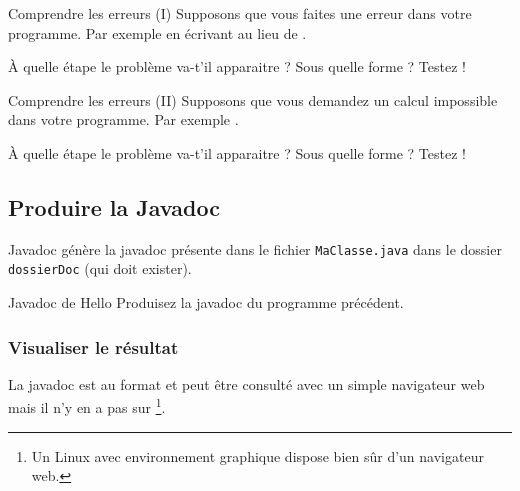 \documentclass[a4paper,11pt]{style-esi/td}
\begin{document}

		\begin{Exercice}{Comprendre les erreurs (I)}
			Supposons que vous faites une erreur dans votre programme.
			Par exemple en écrivant  
			au lieu de .

			À quelle étape le problème va-t'il apparaitre ?
			Sous quelle forme ? Testez !
		\end{Exercice}

		\begin{Exercice}{Comprendre les erreurs (II)}
			Supposons que vous demandez un calcul impossible dans votre programme.
			Par exemple .

			À quelle étape le problème va-t'il apparaitre ?
			Sous quelle forme ? Testez !
		\end{Exercice}

	\subsection{Produire la Javadoc}

		\begin{theorie}{Javadoc}
			génère la javadoc présente dans le fichier \texttt{MaClasse.java}
			dans le dossier \texttt{dossierDoc} (qui doit exister).
		\end{theorie}

		\begin{Exercice}{Javadoc de Hello}
			Produisez la javadoc du programme  précédent.
		\end{Exercice}

		\subsubsection*{Visualiser le résultat}

			La javadoc est au format  et peut être consulté
			avec un simple navigateur web mais il n'y en a pas sur %
			\footnote{%
				Un Linux avec environnement graphique 
				dispose bien sûr d'un navigateur web.
			}.
\end{document}

